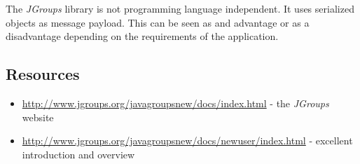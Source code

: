 The \emph{JGroups} library is not programming language independent. It uses serialized objects as message payload. This can be seen as and advantage or as a disadvantage depending on the requirements of the application.


\subsection{Resources}
\begin{itemize}
 \item \url{http://www.jgroups.org/javagroupsnew/docs/index.html} - the \emph{JGroups} website
 \item \url{http://www.jgroups.org/javagroupsnew/docs/newuser/index.html} - excellent introduction and overview
\end{itemize}
